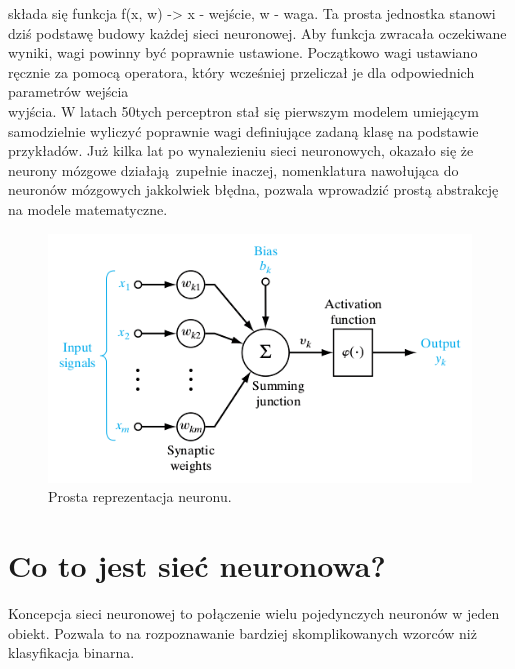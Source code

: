 \documentclass[12pt,a4paper,twoside,titlepage,openright]{book}
\begin{document}
składa się funkcja f(x, w) -> x - wejście, w - waga. Ta prosta jednostka stanowi dziś podstawę budowy każdej sieci neuronowej. Aby funkcja zwracała oczekiwane wyniki, wagi powinny być poprawnie ustawione. Początkowo wagi ustawiano ręcznie za pomocą operatora, który wcześniej przeliczał je dla odpowiednich parametrów wejścia\\wyjścia. W latach 50tych perceptron stał się pierwszym modelem umiejącym samodzielnie wyliczyć poprawnie wagi definiujące zadaną klasę na podstawie przykładów. Już kilka lat po wynalezieniu sieci neuronowych, okazało się że neurony mózgowe działają zupełnie inaczej, nomenklatura nawołująca do neuronów mózgowych jakkolwiek błędna, pozwala wprowadzić prostą abstrakcję na modele matematyczne.

\begin{figure}[h]
	\centering
			\includegraphics[resolution=100]{Neuron.png}
		\caption{Prosta reprezentacja neuronu.}
\end{figure}


\section{Co to jest sieć neuronowa?}
Koncepcja sieci neuronowej to połączenie wielu pojedynczych neuronów w jeden obiekt. Pozwala to na rozpoznawanie bardziej skomplikowanych wzorców niż klasyfikacja binarna. 
\end{document}
